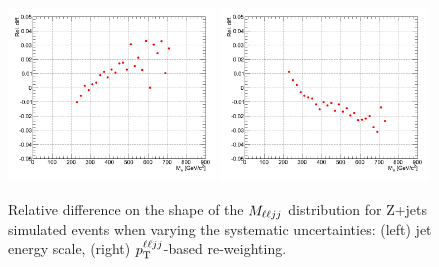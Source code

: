 \begin{figure}[htb]
\begin{center}
\centerline{
\includegraphics[width=0.49\textwidth]{plots/dy2_jsm.png}
\includegraphics[width=0.49\textwidth]{plots/dy2_pthe.png}
}
\caption{Relative difference on the shape of the $M_{\ell\ell jj}$ distribution for Z+jets simulated
events when varying the systematic uncertainties: (left) jet energy scale,
(right) $p_{\mathrm{T}}^{\ell\ell jj}$-based re-weighting.
}
\label{fig:sysshape2d}
\end{center}
\end{figure}

